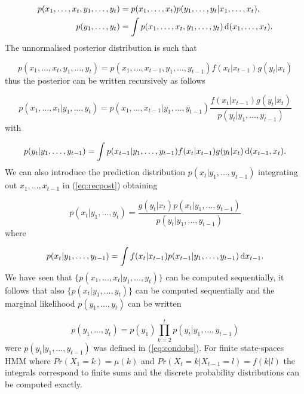 \begin{align*}
    p(x_1, \dots, x_t, y_1, \dots, y_t) &= p(x_1, \dots, x_t) p(y_1, \dots, y_t | x_1, \dots, x_t), \\
    p(y_1, \dots, y_t) &= \int p(x_1, \dots, x_t, y_1, \dots, y_t) \operatorname{d}\!{(}x_1, \dots, x_t).
\end{align*}
The unnormalised posterior distribution is such that

\begin{equation*}
    p(x_1, \dots, x_t, y_1, \dots, y_t) = p(x_1, \dots, x_{t-1}, y_1, \dots, y_{t-1})f(x_t|x_{t-1})g(y_t|x_t)
\end{equation*}
thus the posterior can be written recursively as follows

\begin{equation} \label{eq:recpost}
    p(x_1, \dots, x_t | y_1, \dots, y_t) = p(x_1, \dots, x_{t-1}| y_1, \dots, y_{t-1})\frac{f(x_t|x_{t-1})g(y_t|x_t)}{p(y_t | y_1, \dots, y_{t-1})}
\end{equation}
with

\begin{equation} \label{eq:condobs}
    p(y_t | y_1, \dots, y_{t-1}) = \int p(x_{t-1}| y_1, \dots, y_{t-1}) f(x_t|x_{t-1})g(y_t|x_t) \operatorname{d}\!{(}x_{t-1}, x_t).
\end{equation}
We can also introduce the prediction distribution $p(x_t | y_1, \dots, y_{t-1})$ integrating out $x_1, \dots, x_{t-1}$ in (\ref{eq:recpost}) obtaining

\begin{equation*}
    p(x_t | y_1, \dots, y_t) = \frac{g(y_t | x_t) p(x_t | y_1, \dots, y_{t-1})}{p(y_t | y_1, \dots, y_{t-1})}
\end{equation*}
where

\begin{equation*}
    p(x_t | y_1, \dots, y_{t-1}) = \int f(x_t | x_{t-1}) p(x_{t-1} | y_1, \dots, y_{t-1}) \operatorname{d}\!{x}_{t-1}.
\end{equation*}
We have seen that $\{ p(x_1, \dots, x_t | y_1, \dots, y_t) \}$ can be computed sequentially, it follows that also $\{ p(x_t | y_1, \dots, y_t) \}$ can be computed sequentially and the marginal likelihood $p(y_1, \dots, y_t)$ can be written

\begin{equation*}
    p(y_1, \dots, y_t) = p(y_1)\prod_{k=2}^t p(y_t | y_1, \dots, y_{t-1})
\end{equation*}
were $p(y_t | y_1, \dots, y_{t-1})$ was defined in (\ref{eq:condobs}).
For finite state-spaces HMM where $Pr(X_1 = k) = \mu(k)$ and $Pr(X_t = k | X_{t-1} = l) = f(k|l)$ the integrals correspond to finite sums and the discrete probability distributions can be computed exactly. 

